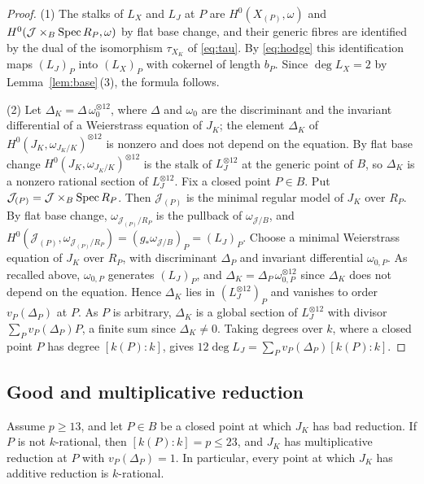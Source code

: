 \begin{proof}
(1) The stalks of $L_X$ and $L_J$ at $P$ are $H^0(X_{(P)},\omega)$ and $H^0(\mathcal J\times_B\operatorname{Spec} R_P,\omega)$ by flat base change, and their generic fibres are identified by the dual of the isomorphism $\tau_{X_K}$ of \eqref{eq:tau}.
By \eqref{eq:hodge} this identification maps $(L_J)_P$ into $(L_X)_P$ with cokernel of length $b_P$.
Since $\deg L_X = 2$ by Lemma~\ref{lem:base}\,(3), the formula follows.

(2) Let $\Delta_K = \Delta\,\omega_0^{\otimes 12}$, where $\Delta$ and $\omega_0$ are the discriminant and the invariant differential of a Weierstrass equation of $J_K$; the element $\Delta_K$ of $H^0(J_K,\omega_{J_K/K})^{\otimes 12}$ is nonzero and does not depend on the equation.
By flat base change $H^0(J_K,\omega_{J_K/K})^{\otimes 12}$ is the stalk of $L_J^{\otimes 12}$ at the generic point of $B$, so $\Delta_K$ is a nonzero rational section of $L_J^{\otimes 12}$.
Fix a closed point $P\in B$.
Put $\mathcal J_{(P)} = \mathcal J\times_B\operatorname{Spec} R_P$.
Then $\mathcal J_{(P)}$ is the minimal regular model of $J_K$ over $R_P$.
By flat base change, $\omega_{\mathcal J_{(P)}/R_P}$ is the pullback of $\omega_{\mathcal J/B}$, and $H^0(\mathcal J_{(P)},\omega_{\mathcal J_{(P)}/R_P}) = (g_*\omega_{\mathcal J/B})_P = (L_J)_P$.
Choose a minimal Weierstrass equation of $J_K$ over $R_P$, with discriminant $\Delta_P$ and invariant differential $\omega_{0,P}$.
As recalled above, $\omega_{0,P}$ generates $(L_J)_P$, and $\Delta_K = \Delta_P\,\omega_{0,P}^{\otimes 12}$ since $\Delta_K$ does not depend on the equation.
Hence $\Delta_K$ lies in $(L_J^{\otimes 12})_P$ and vanishes to order $v_P(\Delta_P)$ at $P$.
As $P$ is arbitrary, $\Delta_K$ is a global section of $L_J^{\otimes 12}$ with divisor $\sum_Pv_P(\Delta_P)P$, a finite sum since $\Delta_K\neq0$.
Taking degrees over $k$, where a closed point $P$ has degree $[k(P):k]$, gives $12\deg L_J = \sum_Pv_P(\Delta_P)[k(P):k]$.
\end{proof}


\subsection{Good and multiplicative reduction}
\begin{lemma}\label{lem:bad-points}
Assume $p\geq 13$, and let $P\in B$ be a closed point at which $J_K$ has bad reduction.
If $P$ is not $k$-rational, then $[k(P):k] = p\leq 23$, and $J_K$ has multiplicative reduction at $P$ with $v_P(\Delta_P) = 1$.
In particular, every point at which $J_K$ has additive reduction is $k$-rational.
\end{lemma}

